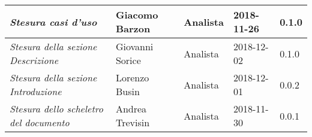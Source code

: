 \begin{table}[H]
\begin{tabular}{p{4cm}|C{3cm}|C{3cm}|R{2.5cm}|R{2cm}}
		\emph{Stesura casi d'uso} & Giacomo Barzon & Analista & 2018-11-26 & 0.1.0 \\
		\hline
		
		\emph{Stesura della sezione Descrizione } & Giovanni Sorice & Analista & 2018-12-02 & 0.1.0 \\
		\hline
		
		\emph{Stesura della sezione Introduzione } & Lorenzo Busin & Analista & 2018-12-01 & 0.0.2 \\
		\hline
		
		\emph{Stesura dello scheletro del documento} & Andrea Trevisin & Analista & 2018-11-30 & 0.0.1 \\
		
	\end{tabular}
	
\end{table}


\clearpage